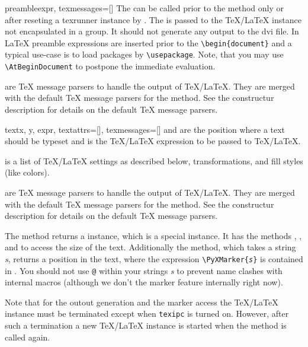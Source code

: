 \begin{methoddesc}{preamble}{expr, texmessages=[]}
  The  can be called prior to the 
  method only or after reseting a texrunner instance by
  . The  is passed to the \TeX/\LaTeX{}
  instance not encapsulated in a group. It should not generate any
  output to the dvi file. In \LaTeX{} preamble expressions are
  inserted prior to the \texttt{\textbackslash{}begin\{document\}} and
  a typical use-case is to load packages by
  \texttt{\textbackslash{}usepackage}. Note, that you may use
  \texttt{\textbackslash{}AtBeginDocument} to postpone the
  immediate evaluation.

   are \TeX{} message parsers to handle the output of
  \TeX/\LaTeX. They are merged with the default \TeX{} message
  parsers for the  method. See the constructur
  description for details on the default \TeX{} message parsers.
\end{methoddesc}

\begin{methoddesc}{text}{x, y, expr, textattrs=[], texmessages=[]}
   and  are the position where a text should be typeset
  and  is the \TeX/\LaTeX{} expression to be passed to
  \TeX/\LaTeX{}.

   is a list of \TeX/\LaTeX{} settings as described
  below, \PyX{} transformations, and \PyX{} fill styles (like colors).

   are \TeX{} message parsers to handle the output of
  \TeX/\LaTeX. They are merged with the default \TeX{} message
  parsers for the  method. See the constructur
  description for details on the default \TeX{} message parsers.

  The  method returns a  instance, which
  is a special  instance. It has the methods
  , , and  to access
  the size of the text. Additionally the  method,
  which takes a string \emph{s}, returns a position in the text, where
  the expression \texttt{\textbackslash{}PyXMarker\{\emph{s}\}} is
  contained in . You should not use \texttt{@} within your
  strings \emph{s} to prevent name clashes with \PyX{}
  internal macros (although we don't the marker feature internally
  right now).
\end{methoddesc}

Note that for the outout generation and the marker access the
\TeX/\LaTeX{} instance must be terminated except when \texttt{texipc} is
turned on. However, after such a termination a new \TeX/\LaTeX{}
instance is started when the  method is called again.


